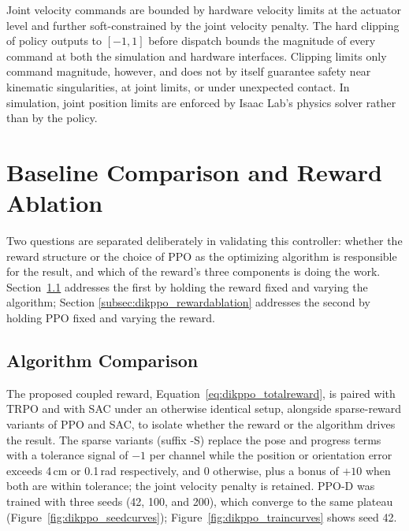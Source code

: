Joint velocity commands are bounded by hardware velocity limits at the actuator level and further
soft-constrained by the joint velocity penalty. The hard clipping of policy outputs to $[-1,1]$
before dispatch bounds the magnitude of every command at both the simulation and hardware
interfaces. Clipping limits only command magnitude, however, and does not by itself guarantee safety
near kinematic singularities, at joint limits, or under unexpected contact. In simulation, joint
position limits are enforced by Isaac Lab's physics solver rather than by the policy.

\section{Baseline Comparison and Reward Ablation}\label{sec:dikppo_ablation}

Two questions are separated deliberately in validating this controller: whether the reward
structure or the choice of PPO as the optimizing algorithm is responsible for the result, and which
of the reward's three components is doing the work. Section~\ref{subsec:dikppo_algcompare}
addresses the first by holding the reward fixed and varying the algorithm; Section
\ref{subsec:dikppo_rewardablation} addresses the second by holding PPO fixed and varying the
reward.

\subsection{Algorithm Comparison}\label{subsec:dikppo_algcompare}

The proposed coupled reward, Equation~\eqref{eq:dikppo_totalreward}, is paired with TRPO and with
SAC under an otherwise identical setup, alongside sparse-reward variants of PPO and SAC, to isolate
whether the reward or the algorithm drives the result. The sparse variants (suffix -S) replace the
pose and progress terms with a tolerance signal of $-1$ per channel while the position or
orientation error exceeds 4\,cm or 0.1\,rad respectively, and $0$ otherwise, plus a bonus of $+10$
when both are within tolerance; the joint velocity penalty is retained. PPO-D was trained with three
seeds (42, 100, and 200), which converge to the same plateau (Figure~\ref{fig:dikppo_seedcurves});
Figure~\ref{fig:dikppo_traincurves} shows seed 42.

